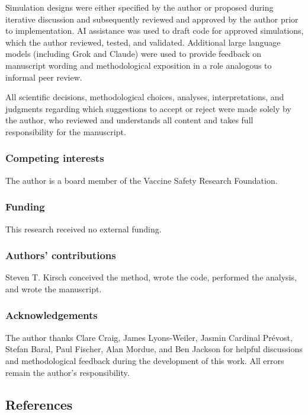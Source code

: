 \documentclass[
]{article}
\begin{document}
Simulation designs were either specified by the author or proposed during iterative discussion and subsequently reviewed and approved by the author prior to implementation. AI assistance was used to draft code for approved simulations, which the author reviewed, tested, and validated. Additional large language models (including Grok and Claude) were used to provide feedback on manuscript wording and methodological exposition in a role analogous to informal peer review.

All scientific decisions, methodological choices, analyses, interpretations, and judgments regarding which suggestions to accept or reject were made solely by the author, who reviewed and understands all content and takes full responsibility for the manuscript.

\subsubsection{Competing interests}\label{competing-interests}

The author is a board member of the Vaccine Safety Research Foundation.

\subsubsection{Funding}\label{funding}

This research received no external funding.

\subsubsection{Authors' contributions}\label{authors-contributions}

Steven T. Kirsch conceived the method, wrote the code, performed the analysis, and wrote the manuscript.

\subsubsection{Acknowledgements}\label{acknowledgements}

The author thanks Clare Craig, James Lyons-Weiler, Jasmin Cardinal Prévost, Stefan Baral, Paul Fischer, Alan Mordue, and Ben Jackson for helpful discussions and methodological feedback during the development of this work. All errors remain the author's responsibility.

\newpage

\subsection{References}\label{references}
\end{document}
